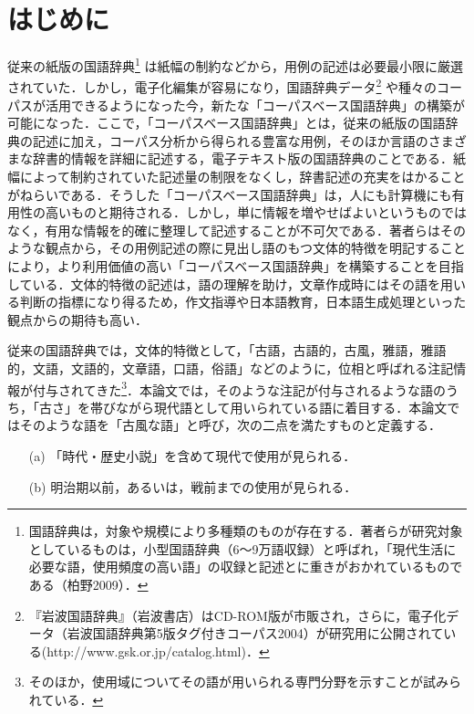 \documentclass[japanese]{jnlp_1.4}
\begin{document}
\maketitle

\section{はじめに}

従来の紙版の国語辞典\footnote{国語辞典は，対象や規模により多種類のものが存在する．著者らが研究対象としているものは，小型国語辞典（6〜9万語収録）と呼ばれ，「現代生活に必要な語，使用頻度の高い語」の収録と記述とに重きがおかれているものである（柏野2009）．} は紙幅の制約などから，用例の記述は必要最小限に厳選されていた．しかし，電子化編集が容易になり，国語辞典データ\footnote{『岩波国語辞典』（岩波書店）はCD-ROM版が市販され，さらに，電子化データ（岩波国語辞典第5版タグ付きコーパス2004）が研究用に公開されている(http://www.gsk.or.jp/catalog.html)．} や種々のコーパスが活用できるようになった今，新たな「コーパスベース国語辞典」の構築が可能になった．ここで，「コーパスベース国語辞典」とは，従来の紙版の国語辞典の記述に加え，コーパス分析から得られる豊富な用例，そのほか言語のさまざまな辞書的情報を詳細に記述する，電子テキスト版の国語辞典のことである．紙幅によって制約されていた記述量の制限をなくし，辞書記述の充実をはかることがねらいである．そうした「コーパスベース国語辞典」は，人にも計算機にも有用性の高いものと期待される．しかし，単に情報を増やせばよいというものではなく，有用な情報を的確に整理して記述することが不可欠である．著者らはそのような観点から，その用例記述の際に見出し語のもつ文体的特徴を明記することにより，より利用価値の高い「コーパスベース国語辞典」を構築することを目指している．文体的特徴の記述は，語の理解を助け，文章作成時にはその語を用いる判断の指標になり得るため，作文指導や日本語教育，日本語生成処理といった観点からの期待も高い．

従来の国語辞典では，文体的特徴として，「古語，古語的，古風，雅語，雅語的，文語，文語的，文章語，口語，俗語」などのように，位相と呼ばれる注記情報が付与されてきた\footnote{そのほか，使用域についてその語が用いられる専門分野を示すことが試みられている．}．本論文では，そのような注記が付与されるような語のうち，「古さ」を帯びながら現代語として用いられている語に着目する．本論文ではそのような語を「古風な語」と呼び，次の二点を満たすものと定義する．

\begin{itemize}
\item[(a)]
「時代・歴史小説」を含めて現代で使用が見られる．
\item[(b)]
明治期以前，あるいは，戦前までの使用が見られる．
\end{itemize}
\end{document}
